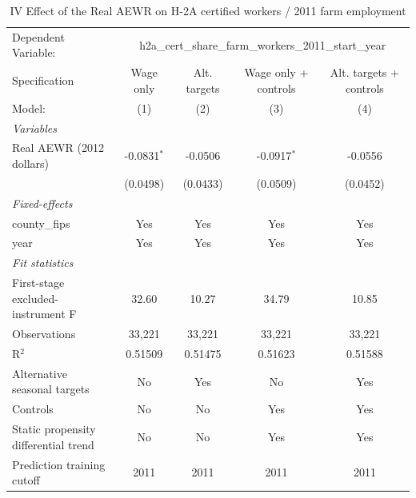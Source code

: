 
\begin{table}[htbp]
   \caption{\label{tab:iv_h2a_normalized} IV Effect of the Real AEWR on H-2A certified workers / 2011 farm employment}
   \centering
   \begin{tabular}{lcccc}
      \tabularnewline \midrule \midrule
      Dependent Variable: & \multicolumn{4}{c}{h2a\_cert\_share\_farm\_workers\_2011\_start\_year}\\
      Specification                        & Wage only     & Alt. targets & Wage only + controls & Alt. targets + controls \\   
      Model:                               & (1)           & (2)          & (3)                  & (4)\\  
      \midrule
      \emph{Variables}\\
      Real AEWR (2012 dollars)             & -0.0831$^{*}$ & -0.0506      & -0.0917$^{*}$        & -0.0556\\   
                                           & (0.0498)      & (0.0433)     & (0.0509)             & (0.0452)\\   
      \midrule
      \emph{Fixed-effects}\\
      county\_fips                         & Yes           & Yes          & Yes                  & Yes\\  
      year                                 & Yes           & Yes          & Yes                  & Yes\\  
      \midrule
      \emph{Fit statistics}\\
      First-stage excluded-instrument F    & 32.60         & 10.27        & 34.79                & 10.85\\  
      Observations                         & 33,221        & 33,221       & 33,221               & 33,221\\  
      R$^2$                                & 0.51509       & 0.51475      & 0.51623              & 0.51588\\  
      Alternative seasonal targets         & No            & Yes          & No                   & Yes\\  
      Controls                             & No            & No           & Yes                  & Yes\\  
      Static propensity differential trend & No            & No           & Yes                  & Yes\\  
      Prediction training cutoff           & 2011          & 2011         & 2011                 & 2011\\  

\end{tabular}
\end{table}
